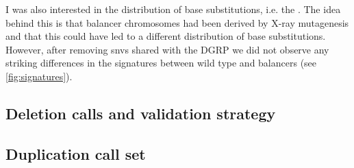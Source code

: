 I was also interested in the distribution of base substitutions, i.e.
the . The idea behind this is that
balancer chromosomes had been derived by X-ray mutagenesis and that this
could have led to a different distribution of base substitutions. However, after
removing \acp{snv} shared with the DGRP we did not observe any striking
differences in the \snv signatures between wild type and balancers (see
\cref{fig:signatures}).

\subsection{Deletion calls and validation strategy}
\subsection{Duplication call set}
